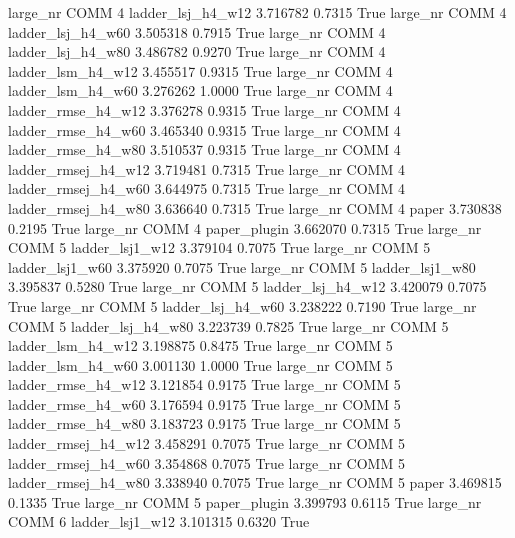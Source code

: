   large_nr     COMM                 4   ladder_lsj_h4_w12   3.716782      0.7315    True
  large_nr     COMM                 4   ladder_lsj_h4_w60   3.505318      0.7915    True
  large_nr     COMM                 4   ladder_lsj_h4_w80   3.486782      0.9270    True
  large_nr     COMM                 4   ladder_lsm_h4_w12   3.455517      0.9315    True
  large_nr     COMM                 4   ladder_lsm_h4_w60   3.276262      1.0000    True
  large_nr     COMM                 4  ladder_rmse_h4_w12   3.376278      0.9315    True
  large_nr     COMM                 4  ladder_rmse_h4_w60   3.465340      0.9315    True
  large_nr     COMM                 4  ladder_rmse_h4_w80   3.510537      0.9315    True
  large_nr     COMM                 4 ladder_rmsej_h4_w12   3.719481      0.7315    True
  large_nr     COMM                 4 ladder_rmsej_h4_w60   3.644975      0.7315    True
  large_nr     COMM                 4 ladder_rmsej_h4_w80   3.636640      0.7315    True
  large_nr     COMM                 4               paper   3.730838      0.2195    True
  large_nr     COMM                 4        paper_plugin   3.662070      0.7315    True
  large_nr     COMM                 5     ladder_lsj1_w12   3.379104      0.7075    True
  large_nr     COMM                 5     ladder_lsj1_w60   3.375920      0.7075    True
  large_nr     COMM                 5     ladder_lsj1_w80   3.395837      0.5280    True
  large_nr     COMM                 5   ladder_lsj_h4_w12   3.420079      0.7075    True
  large_nr     COMM                 5   ladder_lsj_h4_w60   3.238222      0.7190    True
  large_nr     COMM                 5   ladder_lsj_h4_w80   3.223739      0.7825    True
  large_nr     COMM                 5   ladder_lsm_h4_w12   3.198875      0.8475    True
  large_nr     COMM                 5   ladder_lsm_h4_w60   3.001130      1.0000    True
  large_nr     COMM                 5  ladder_rmse_h4_w12   3.121854      0.9175    True
  large_nr     COMM                 5  ladder_rmse_h4_w60   3.176594      0.9175    True
  large_nr     COMM                 5  ladder_rmse_h4_w80   3.183723      0.9175    True
  large_nr     COMM                 5 ladder_rmsej_h4_w12   3.458291      0.7075    True
  large_nr     COMM                 5 ladder_rmsej_h4_w60   3.354868      0.7075    True
  large_nr     COMM                 5 ladder_rmsej_h4_w80   3.338940      0.7075    True
  large_nr     COMM                 5               paper   3.469815      0.1335    True
  large_nr     COMM                 5        paper_plugin   3.399793      0.6115    True
  large_nr     COMM                 6     ladder_lsj1_w12   3.101315      0.6320    True
